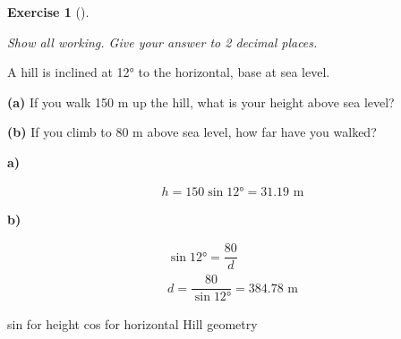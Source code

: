 \documentclass[
  letterpaper,
  DIV=11,
  numbers=noendperiod]{scrreprt}
\theoremstyle{definition}
\newtheorem{exercise}{Exercise}[chapter]
\theoremstyle{remark}
\begin{document}
\begin{exercise}[]\protect\hypertarget{exr-trig-18}{}\label{exr-trig-18}

\emph{Show all working. Give your answer to 2 decimal places.}

A hill is inclined at 12° to the horizontal, base at sea level.

\textbf{(a)} If you walk 150 m up the hill, what is your height above
sea level?

\textbf{(b)} If you climb to 80 m above sea level, how far have you
walked?

\begin{tcolorbox}[enhanced jigsaw, opacitybacktitle=0.6, coltitle=black, arc=.35mm, colframe=quarto-callout-tip-color-frame, colback=white, bottomrule=.15mm, left=2mm, colbacktitle=quarto-callout-tip-color!10!white, titlerule=0mm, opacityback=0, title=\textcolor{quarto-callout-tip-color}{\faLightbulb}\hspace{0.5em}{🔍 View Solution}, leftrule=.75mm, breakable, rightrule=.15mm, bottomtitle=1mm, toptitle=1mm, toprule=.15mm]

\textbf{a)}

\[
\begin{aligned}
h = 150 \sin 12° = 31.19 \text{ m}
\end{aligned}
\]

\textbf{b)}

\[
\begin{aligned}
\sin 12° = \dfrac{80}{d} \\ d = \dfrac{80}{\sin 12°} = 384.78 \text{ m}
\end{aligned}
\]

\end{tcolorbox}

{sin for height} {cos for horizontal} {Hill geometry}

\end{exercise}
\end{document}
